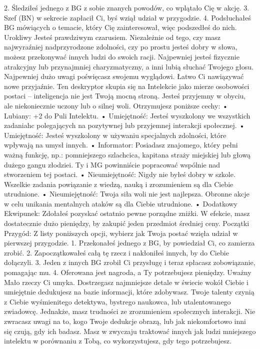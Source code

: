 2. Śledziłeś jednego z BG z sobie znanych powodów, co wplątało Cię w akcję.
3. Szef (BN) w sekrecie zapłacił Ci, byś wziął udział w przygodzie.
4. Podsłuchałeś BG mówiących o temacie, który Cię zainteresował, więc podszedłeś do nich.
Urokliwy
Jesteś prawdziwym czarusiem. Niezależnie od tego, czy masz najwyraźniej nadprzyrodzone zdolności, czy po prostu jesteś dobry w słowa, możesz przekonywać innych ludzi do swoich racji. Najpewniej jesteś fizycznie atrakcyjny lub przynajmniej charyzmatyczny, a inni lubią słuchać Twojego głosu. Najpewniej dużo uwagi poświęcasz swojemu wyglądowi. Łatwo Ci nawiązywać nowe przyjaźnie. Ten deskryptor skupia się na Intelekcie jako mierze osobowości postaci – inteligencja nie jest Twoją mocną stroną. Jesteś przyjemny w obyciu, ale niekoniecznie uczony lub o silnej woli. 
Otrzymujesz poniższe cechy:
    • Lubiany: +2 do Puli Intelektu.
    • Umiejętność: Jesteś wyszkolony we wszystkich zadaniahc polegających na pozytywnej lub przyjemnej interakcji społecznej.
    • Umiejętność: Jesteś wyszkolony w używaniu specjalnych zdolności, które wpływają na umysł innych.
    • Informator: Posiadasz znajomego, który pełni ważną funkcję, np.: pomniejszego szlachcica, kapitana straży miejskiej lub głową dużego gangu złodziei. Ty i MG powinniście popracować wspólnie nad stworzeniem tej postaci.
    • Nieumiejętność: Nigdy nie byłeś dobry w szkole. Wszelkie zadania powiązanie z wiedzą, nauką i zrozumieniem są dla Ciebie utrudnione.
    • Nieumiejętność: Twoja siła woli nie jest najlepsza. Obronne akcje w celu unikania mentalnych ataków są dla Ciebie utrudnione.
    • Dodatkowy Ekwipunek: Zdołałeś pozyskać ostatnio pewne porządne zniżki. W efekcie, masz dostatecznie dużo pieniędzy, by zakupić jeden przedmiot średniej ceny. 
Początki Przygód: Z listy poniższych opcji, wybierz jak Twoja postać wzięła udział w pierwszej przygodzie.
1. Przekonałeś jednego z BG, by powiedział Ci, co zamierza zrobić.
2. Zapoczątkowałeś całą tę rzecz i nakłoniłeś innych, by do Ciebie dołączyli.
3. Jeden z innych BG zrobił Ci przysługę i teraz spłacasz zobowiązanie, pomagając mu.
4. Oferowana jest nagroda, a Ty potrzebujesz pieniędzy.
Uważny
Mało rzeczy Ci umyka. Dostrzegasz najmniejsze detale w świecie wokół Ciebie i umiejętnie dedukujesz na bazie informacji, które zdobywasz. Twoje talenty czynią z Ciebie wyśmienitego detektywa, bystrego naukowca, lub utalentowanego zwiadowcę.
Jednakże, masz trudności ze zrozumieniem społecznych interakcji. Nie zwracasz uwagi na to, kogo Twoje dedukcje obrazą, lub jak niekomfortowo inni się czują, gdy ich badasz. Masz w zwyczaju traktować innych jak ludzi mniejszego intelektu w porównaniu z Tobą, co wykorzystujesz, gdy tego potrzebujesz.
